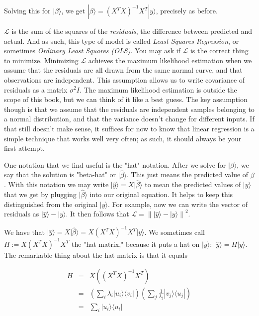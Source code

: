 \documentclass{amsbook}
\begin{document}
Solving this for $|\beta\rangle$, we get $|\beta\rangle=\left(X^TX\right)^{-1}X^T|y\rangle$, precisely as before.

$\mathcal L$ is the sum of the squares of the {\em residuals}, the difference between predicted and actual.  And as such, this type of model is called {\em Least Squares Regression}, or sometimes {\em Ordinary Least Squares (OLS)}.  You may ask if $\mathcal L$ is the correct thing to minimize.  Minimizing $\mathcal L$ achieves the maximum likelihood estimation when we assume that the residuals are all drawn from the same normal curve, and that observations are independent.  This assumption allows us to write covariance of residuals as a matrix $\sigma^2I$.  The maximum likelihood estimation is outside the scope of this book, but we can think of it like a best guess.  The key assumption though is that we assume that the residuals are independent samples belonging to a normal distribution, and that the variance doesn't change for different inputs.  If that still doesn't make sense, it suffices for now to know that linear regression is a simple technique that works well very often; as such, it should always be your first attempt.

One notation that we find useful is the "hat" notation.  After we solve for $|\beta\rangle$, we say that the solution is "beta-hat" or $|\hat\beta\rangle$.  This just means the predicted value of $\beta$.  With this notation we may write $|\hat y\rangle=X|\hat\beta\rangle$ to mean the predicted values of $|y\rangle$ that we get by plugging $|\hat\beta\rangle$ into our original equation.  It helps to keep this distinguished from the original $|y\rangle$.  For example, now we can write the vector of residuals as $|\hat y\rangle-|y\rangle$.  It then follows that $\mathcal L=\left\| |\hat y\rangle-|y\rangle \right\|^2$.

We have that $|\hat y\rangle=X|\hat\beta\rangle=X\left(X^TX\right)^{-1}X^T|y\rangle$.  We sometimes call $H:=X\left(X^TX\right)^{-1}X^T$ the "hat matrix," because it puts a hat on $|y\rangle$:  $|\hat y\rangle=H|y\rangle$.  The remarkable thing about the hat matrix is that it equals

$$
\begin{array}{rcl}
H&=&X\left(\left(X^TX\right)^{-1}X^T\right) \\
&=&\left(\sum_i\lambda_i|u_i\rangle\langle v_i|\right)\left(\sum_j\frac{1}{\lambda_j}|v_j\rangle\langle u_j|\right) \\
&=&\sum_i|u_i\rangle\langle u_i|
\end{array}
$$
\end{document}
